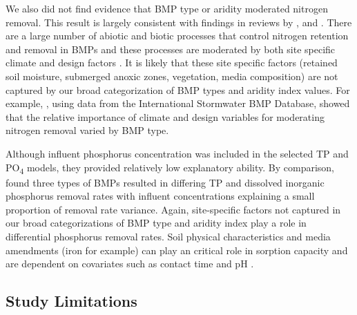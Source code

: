 \documentclass[utf8]{FrontiersinHarvard}
\begin{document}
We also did not find evidence that BMP type or aridity moderated nitrogen removal.
This result is largely consistent with findings in reviews by \citet{kochNitrogenRemovalStormwater2014}, \citet{hagerPerformanceLowimpactDevelopment2019} and \citet{horvathEffectsRegionalClimate2023}.
There are a large number of abiotic and biotic processes that control nitrogen retention and removal in BMPs and these processes are moderated by both site specific climate and design factors \citep{lefevreReviewDissolvedPollutants2015, valencaNitrateRemovalUncertainty2021}.
It is likely that these site specific factors (retained soil moisture, submerged anoxic zones, vegetation, media composition) are not captured by our broad categorization of BMP types and aridity index values.
For example, \citet{valencaNitrateRemovalUncertainty2021}, using data from the International Stormwater BMP Database, showed that the relative importance of climate and design variables for moderating nitrogen removal varied by BMP type.

Although influent phosphorus concentration was included in the selected TP and PO\textsubscript{4} models, they provided relatively low explanatory ability.
By comparison, \citet{horvathEffectsRegionalClimate2023} found three types of BMPs resulted in differing TP and dissolved inorganic phosphorus removal rates with influent concentrations explaining a small proportion of removal rate variance.
Again, site-specific factors not captured in our broad categorizations of BMP type and aridity index play a role in differential phosphorus removal rates.
Soil physical characteristics and media amendments (iron for example) can play an critical role in sorption capacity and are dependent on covariates such as contact time and pH \citep{hoganBestManagementPractices2007, lefevreReviewDissolvedPollutants2015}.

\hypertarget{study-limitations}{%
\subsection{Study Limitations}\label{study-limitations}}
\end{document}
